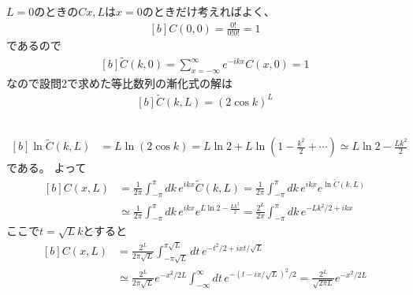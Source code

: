 \documentclass[../../sp_2014.tex]{subfiles}
\begin{document}
\subsection{}
\(L=0\)のときの\(C{x,L}\)は\(x=0\)のときだけ考えればよく、
\begin{equation}\begin{aligned}[b]
    C(0,0) = \frac{0!}{0!0!} = 1
\end{aligned}\end{equation}
であるので
\begin{equation}\begin{aligned}[b]
    \tilde{C}(k,0) = \sum_{x=-\infty}^{\infty}e^{-ikx}C(x,0) = 1
\end{aligned}\end{equation}
なので設問2で求めた等比数列の漸化式の解は
\begin{equation}\begin{aligned}[b]
    \tilde{C}(k,L) =(2\cos k)^L
\end{aligned}\end{equation}

\subsection{}
\begin{equation}\begin{aligned}[b]
    \ln \tilde{C}(k,L) &= L\ln (2\cos k)
    = L \ln 2+L\ln(1-\frac{k^2}{2}+\cdots)
    \simeq L\ln 2-\frac{Lk^2}{2}
\end{aligned}\end{equation}
である。
よって
\begin{equation}\begin{aligned}[b]
    C(x,L) &= \frac{1}{2\pi}\int_{-\pi}^{\pi}dk\,e^{ikx}\tilde{C}(k,L)
    = \frac{1}{2\pi}\int_{-\pi}^{\pi}dk\,e^{ikx}e^{\ln\tilde{C}(k,L)}\\
    &\simeq \frac{1}{2\pi}\int_{-\pi}^{\pi}dk\,e^{ikx}e^{L\ln 2-\frac{Lk^2}{2}}
    = \frac{2^L}{2\pi}\int_{-\pi}^{\pi}dk\,e^{-Lk^2/2+ikx}
\end{aligned}\end{equation}
ここで\(t=\sqrt{L}k\)とすると
\begin{equation}\begin{aligned}[b]
    C(x,L) &= \frac{2^L}{2\pi\sqrt{L}}\int_{-\pi\sqrt{L}}^{\pi\sqrt{L}}dt\,e^{-t^2/2+ixt/\sqrt{L}}\\
    &\simeq \frac{2^L}{2\pi\sqrt{L}}e^{-x^2/2L}\int_{-\infty}^{\infty}dt\,e^{-(t-ix/\sqrt{L})^2/2}
    = \frac{2^L}{\sqrt{2\pi L}}e^{-x^2/2L}
\end{aligned}\end{equation}
\end{document}
